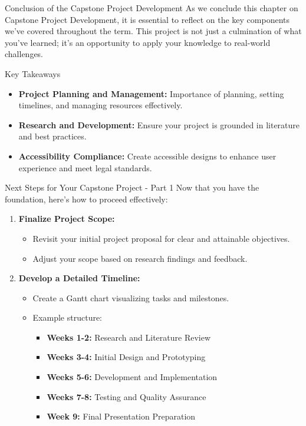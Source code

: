 \documentclass[aspectratio=169]{beamer}
\begin{document}
\begin{frame}[fragile]{Conclusion of the Capstone Project Development}
  As we conclude this chapter on Capstone Project Development, it is essential to reflect on the key components we’ve covered throughout the term. 
  This project is not just a culmination of what you’ve learned; it’s an opportunity to apply your knowledge to real-world challenges.
  
  \begin{block}{Key Takeaways}
    \begin{itemize}
      \item \textbf{Project Planning and Management:} Importance of planning, setting timelines, and managing resources effectively.
      \item \textbf{Research and Development:} Ensure your project is grounded in literature and best practices.
      \item \textbf{Accessibility Compliance:} Create accessible designs to enhance user experience and meet legal standards.
    \end{itemize}
  \end{block}
\end{frame}

\begin{frame}[fragile]{Next Steps for Your Capstone Project - Part 1}
  Now that you have the foundation, here’s how to proceed effectively:

  \begin{enumerate}
    \item \textbf{Finalize Project Scope:}
      \begin{itemize}
        \item Revisit your initial project proposal for clear and attainable objectives.
        \item Adjust your scope based on research findings and feedback.
      \end{itemize}

    \item \textbf{Develop a Detailed Timeline:}
      \begin{itemize}
        \item Create a Gantt chart visualizing tasks and milestones.
        \item Example structure:
          \begin{itemize}
            \item \textbf{Weeks 1-2:} Research and Literature Review
            \item \textbf{Weeks 3-4:} Initial Design and Prototyping
            \item \textbf{Weeks 5-6:} Development and Implementation
            \item \textbf{Weeks 7-8:} Testing and Quality Assurance
            \item \textbf{Week 9:} Final Presentation Preparation
          \end{itemize}
        \end{itemize}
  \end{enumerate}
\end{frame}
\end{document}
